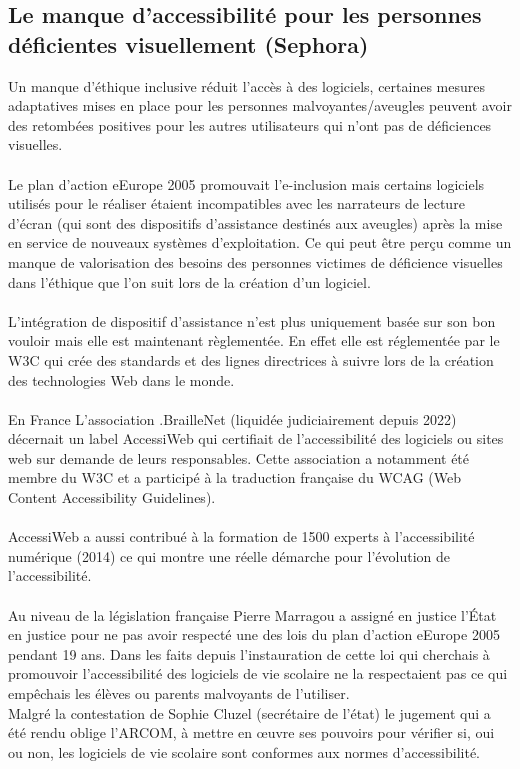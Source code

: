 \documentclass{article}
\begin{document}
\subsection{Le manque d'accessibilité pour les personnes déficientes visuellement (Sephora)}

Un manque d’éthique inclusive réduit l’accès à des logiciels, certaines mesures adaptatives mises en place pour les personnes malvoyantes/aveugles peuvent avoir des retombées positives pour les autres utilisateurs qui n’ont pas de déficiences visuelles. \\ \\
Le plan d’action eEurope 2005 promouvait l’e-inclusion mais certains logiciels utilisés pour le réaliser étaient incompatibles avec les narrateurs de lecture d'écran (qui sont des dispositifs d’assistance destinés aux aveugles) après la mise en service de nouveaux systèmes d'exploitation. Ce qui peut être perçu comme un manque de valorisation des besoins des personnes victimes de déficience visuelles dans l’éthique que l’on suit lors de la création d’un logiciel. 
\\\\
L’intégration de dispositif d’assistance n’est plus uniquement basée sur son bon vouloir mais elle est maintenant règlementée. En effet elle est réglementée par le W3C qui crée des standards et des lignes directrices à suivre lors de la création des technologies Web dans le monde. 
\\\\
En France L’association \cite{Wikipedia}.BrailleNet (liquidée judiciairement depuis 2022) décernait un label AccessiWeb qui certifiait de l’accessibilité des logiciels ou sites web sur demande de leurs responsables. Cette association a notamment été membre du W3C et a participé à la traduction française du WCAG (Web Content Accessibility Guidelines). 
\\\\
AccessiWeb a aussi contribué à la formation de 1500 experts à l’accessibilité numérique (2014) ce qui montre une réelle démarche pour l’évolution de l’accessibilité. 
\\\\
\cite{Gourvennec_2024}Au niveau de la législation française Pierre Marragou a assigné en justice l’État en justice pour ne pas avoir respecté une des lois du plan d’action eEurope 2005 pendant 19 ans. Dans les faits depuis l’instauration de cette loi qui cherchais à promouvoir l’accessibilité des logiciels de vie scolaire ne la respectaient pas ce qui empêchais les élèves ou parents malvoyants de l’utiliser. \\ Malgré la contestation de Sophie Cluzel (secrétaire de l’état) le jugement qui a été rendu oblige l’ARCOM, à mettre en œuvre ses pouvoirs pour vérifier si, oui ou non, les logiciels de vie scolaire sont conformes aux normes d’accessibilité. \\\\ 
\end{document}
